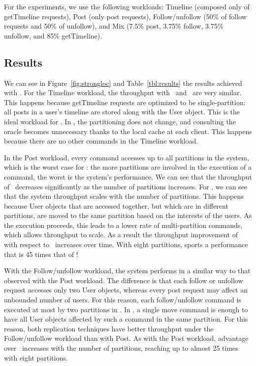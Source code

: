For the experiments, we use the following workloads:
Timeline (composed only of getTimeline requests),
Post (only post requests),
Follow/unfollow (50\% of follow requests and 50\% of unfollow), and
Mix (7.5\% post, 3.75\% follow, 3.75\% unfollow, and 85\% getTimeline).

\subsection{Results }
\label{sec:evaluation:strongloc}


We can see in Figure~\ref{fig:strongloc} and Table~\ref{tbl:results} the results achieved with \appname{}.
For the Timeline workload, the throughput with \dssmr\ and \ssmr\ are very similar.
This happens because getTimeline requests are optimized to be single-partition:
all posts in a user's timeline are stored along with the User object.
This is the ideal workload for \ssmr{}.
In \dssmr{}, the partitioning does not change, and consulting the oracle becomes unnecessary thanks to the local cache at each client.
This happens because there are no other commands in the Timeline workload.

In the Post workload, every command accesses up to all partitions in the system, which is the worst case for \ssmr{}: the more partitions are involved in the execution of a command, the worst is the system's performance.
We can see that the throughput of \ssmr\ decreases significantly as the number of partitions increases.
For \dssmr{}, we can see that the system throughput scales with the number of partitions.
This happens because User objects that are accessed together, but which are in different partitions, are moved to the same partition based on the interests of the users.
As the execution proceeds, this leads to a lower rate of multi-partition commands, which allows throughput to scale.
As a result the throughput improvement of \dssmr{} with respect to \ssmr\ increases over time.
With eight partitions, \dssmr{} sports a performance that is 45 times that of \ssmr!

With the Follow/unfollow workload, the system performs in a similar way to that observed with the Post workload.
The difference is that each follow or unfollow request accesses only two User objects, whereas every post request may affect an unbounded number of users.
For this reason, each follow/unfollow command is executed at most by two partitions in \ssmr{}.
In \dssmr{}, a single move command is enough to have all User objects affected by such a command in the same partition.
For this reason, both replication techniques have better throughput under the Follow/unfollow workload than with Post.
As with the Post workload, \dssmr{} advantage over \ssmr\ increases with the number of partitions, reaching up to almost 25 times with eight partitions.

